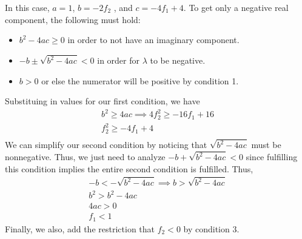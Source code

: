 \begin{enumerate}
{    In this case, $a = 1$,  $b = -2f_2$ , and $c = -4f_1 + 4$.
    To get only a negative real component, the following must hold:
    \begin{itemize}
    \item $b^{2}-4ac \geq 0$ in order to not have an imaginary component.
    \item $-b \pm \sqrt{b^{2} - 4ac} < 0$ in order for $\lambda$ to be negative.
    \item $b > 0$ or else the numerator will be positive by condition 1.
    \end{itemize}

    Substituing in values for our first condition, we have
    \begin{align*}
    b^2 \geq 4ac \implies 4f_{2}^{2} \geq -16f_1 + 16 \\
     f_{2}^{2} \geq -4f_{1} + 4 \\
    \end{align*}
    We can simplify our second condition by noticing that $\sqrt{b^{2} - 4ac}$ must be nonnegative.
    Thus, we just need to analyze $-b + \sqrt{b^{2} - 4ac} < 0$ since fulfilling this condition implies the entire second condition is fulfilled.
    Thus,
    \begin{align*}
    -b < -\sqrt{b^{2} - 4ac} \implies b > \sqrt{b^{2} - 4ac}\\
    b^{2} > b^{2} - 4ac \\
    4ac > 0 \\
    f_1 < 1
    \end{align*}
    Finally, we also, add the restriction that $f_2 < 0$ by condition 3.


}
\end{enumerate}
